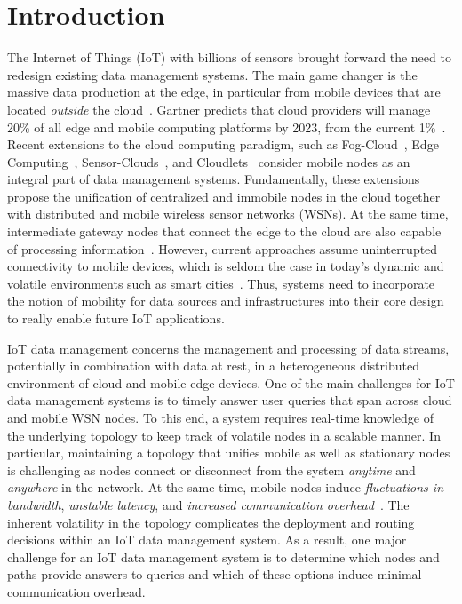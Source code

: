 \section{Introduction}
\label{sec:introduction}
The Internet of Things (IoT) with billions of sensors brought forward the need to redesign existing data management systems.
% 
The main game changer is the massive data production at the edge, in particular from mobile devices that are located \textit{outside} the cloud~\cite{zeuch2020nebulastream}.
%
Gartner predicts that cloud providers will manage 20\% of all edge and mobile computing platforms by 2023, from the current 1\%~\cite{mcarthur2020gartner}.
Recent extensions to the cloud computing paradigm, such as Fog-Cloud~\cite{bonomi2012fog}, Edge Computing~\cite{shi2016edge}, Sensor-Clouds~\cite{yuriyama2010sensor}, and Cloudlets~\cite{satyanarayanan2009case} consider mobile nodes as an integral part of data management systems.
%
Fundamentally, these extensions propose the unification of centralized and immobile nodes in the cloud together with distributed and mobile wireless sensor networks (WSNs). At the same time, intermediate gateway nodes that connect the edge to the cloud are also capable of processing information~\cite{lerner2019cidr, zhang2020gallium}.
% 
However, current approaches assume uninterrupted connectivity to mobile devices, which is seldom the case in today's dynamic and volatile environments such as smart cities~\cite{bonomi2012fog}.
% 
Thus, systems need to incorporate the notion of mobility for data sources and infrastructures into their core design to really enable future IoT applications.

IoT data management concerns the management and processing of data streams, potentially in combination with data at rest, in a heterogeneous distributed environment
 of cloud and mobile edge devices.
One of the main challenges for IoT data management systems is to timely answer user queries that span across cloud and mobile WSN nodes. 
To this end, a system requires real-time knowledge of the underlying topology to keep track of volatile nodes in a scalable manner.
% 
In particular, maintaining a topology that unifies mobile as well as stationary nodes is challenging as nodes connect or disconnect from the system \textit{anytime} and \textit{anywhere} in the network.
% 
At the same time, mobile nodes induce \textit{fluctuations in bandwidth}, \textit{unstable latency}, and \textit{increased  communication overhead}~\cite{li2020beyond}.
% 
The inherent volatility in the topology complicates the deployment and routing decisions within an IoT data management system. 
% 
% 
As a result, one major challenge for an IoT data management system is to determine which nodes and paths provide answers to queries and which of these options induce minimal communication overhead.

